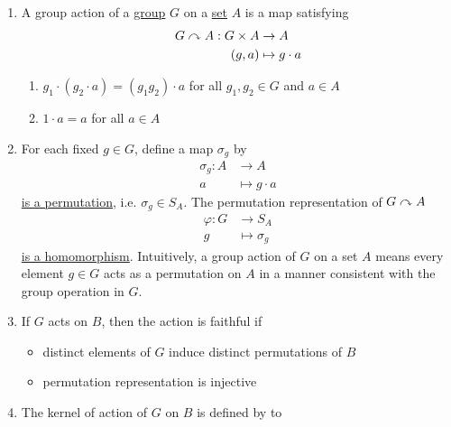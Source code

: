 \documentclass[11pt]{article}
\begin{document}
\section{}


\begin{definition*}
    \begin{enumerate}
        \item {} A group action of a \underline{group} $G$ on a \underline{set} $A$ is a map satisfying
        \begin{align*}
            G\curvearrowright A: G\times A &\to A \\
                        (g,a)     &\mapsto g\cdot a
        \end{align*}
        \begin{enumerate}
            \item $g_1 \cdot (g_2 \cdot a) = (g_1 g_2) \cdot a$ for all $g_1,g_2\in G$ and $a\in A$ 
            \item $1\cdot a = a$ for all $a\in A$
        \end{enumerate}
        \item {}
        For each fixed $g\in G$, define a map $\sigma_g$ by 
        \begin{align*}
            \sigma_g: A &\to A \\
            a&\mapsto g\cdot a
        \end{align*}
        \underline{is a permutation}, i.e. $\sigma_g \in S_A$. The permutation representation of $G\curvearrowright A$
        \begin{align*}
            \varphi: G &\to S_A \\
                     g &\mapsto \sigma_g
        \end{align*}
        \underline{is a homomorphism}.
        Intuitively, a group action of $G$ on a set $A$ means every element $g\in G$ acts as a permutation on $A$ in a manner consistent with the group operation in $G$.
        \item {} If $G$ acts on $B$, then the action is faithful if
        \begin{itemize}
            \item distinct elements of $G$ induce distinct permutations of $B$
            \item permutation representation is injective
        \end{itemize}
        \item {} The kernel of action of $G$ on $B$ is defined by to 

\end{enumerate}
\end{definition*}
\end{document}
